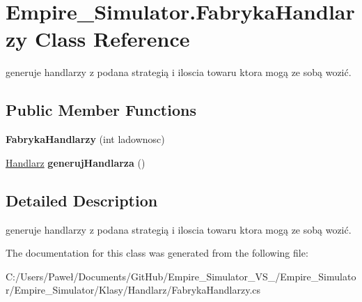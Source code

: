 \hypertarget{class_empire___simulator_1_1_fabryka_handlarzy}{\section{Empire\+\_\+\+Simulator.\+Fabryka\+Handlarzy Class Reference}
\label{class_empire___simulator_1_1_fabryka_handlarzy}
}


generuje handlarzy z podana strategią i iloscia towaru ktora mogą ze sobą wozić.  


\subsection*{Public Member Functions}
\begin{DoxyCompactItemize}
\item 
\hypertarget{class_empire___simulator_1_1_fabryka_handlarzy_ac57e9502961d8f7713b1071c8557387a}{{\bfseries Fabryka\+Handlarzy} (int ladownosc)}\label{class_empire___simulator_1_1_fabryka_handlarzy_ac57e9502961d8f7713b1071c8557387a}

\item 
\hypertarget{class_empire___simulator_1_1_fabryka_handlarzy_a1526a5d274fa0c33722422a98de43644}{\hyperlink{class_empire___simulator_1_1_handlarz}{Handlarz} {\bfseries generuj\+Handlarza} ()}\label{class_empire___simulator_1_1_fabryka_handlarzy_a1526a5d274fa0c33722422a98de43644}

\end{DoxyCompactItemize}


\subsection{Detailed Description}
generuje handlarzy z podana strategią i iloscia towaru ktora mogą ze sobą wozić. 



The documentation for this class was generated from the following file\+:\begin{DoxyCompactItemize}
\item 
C\+:/\+Users/\+Paweł/\+Documents/\+Git\+Hub/\+Empire\+\_\+\+Simulator\+\_\+\+V\+S\+\_/\+Empire\+\_\+\+Simulator/\+Empire\+\_\+\+Simulator/\+Klasy/\+Handlarz/Fabryka\+Handlarzy.\+cs\end{DoxyCompactItemize}
